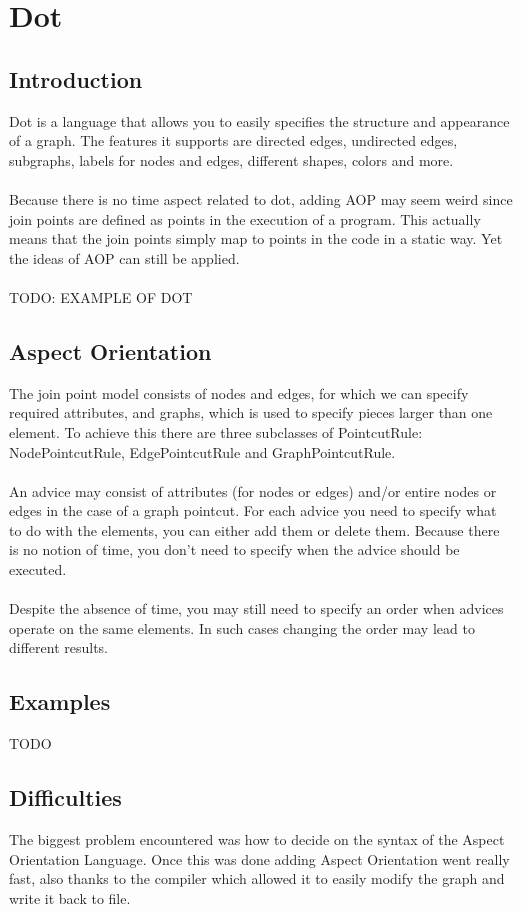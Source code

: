 \documentclass[a4paper]{report}
\begin{document}
\chapter{Dot}
\section{Introduction}
Dot is a language that allows you to easily specifies the structure and appearance of a graph. The features it supports are directed edges, undirected edges, subgraphs, labels for nodes and edges, different shapes, colors and more.\\
\\
Because there is no time aspect related to dot, adding AOP may seem weird since join points are defined as points in the execution of a program. This actually means that the join points simply map to points in the code in a static way. Yet the ideas of AOP can still be applied.\\
\\
TODO: EXAMPLE OF DOT

\section{Aspect Orientation}
The join point model consists of nodes and edges, for which we can specify required attributes, and graphs, which is used to specify pieces larger than one element. To achieve this there are three subclasses of PointcutRule: NodePointcutRule, EdgePointcutRule and GraphPointcutRule.\\
\\
An advice may consist of attributes (for nodes or edges) and/or entire nodes or edges in the case of a graph pointcut. For each advice you need to specify what to do with the elements, you can either add them or delete them. Because there is no notion of time, you don't need to specify when the advice should be executed.\\
\\
Despite the absence of time, you may still need to specify an order when advices operate on the same elements. In such cases changing the order may lead to different results.

\section{Examples}
TODO

\section{Difficulties}
The biggest problem encountered was how to decide on the syntax of the Aspect Orientation Language. Once this was done adding Aspect Orientation went really fast, also thanks to the compiler which allowed it to easily modify the graph and write it back to file.\\
\end{document}

